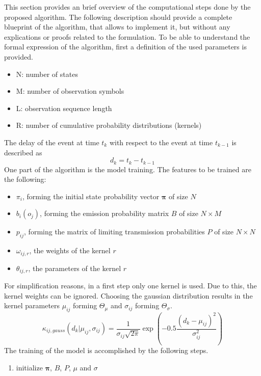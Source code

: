 \documentclass[12pt]{article} %
\begin{document}
This section provides an brief overview of the computational steps done by the
proposed algorithm. The following description should provide a complete
blueprint of the algorithm, that allows to implement it, but without any
explications or proofs related to the formulation. To be able to understand the
formal expression of the algorithm, first a definition of the used parameters
is provided.
\begin{itemize}
    \item N: number of states
    \item M: number of observation symbols
    \item L: observation sequence length
    \item R: number of cumulative probability distributions (kernels)
\end{itemize}
The delay of the event at time $ t_k $ with respect to the event at time
$ t_{k-1} $ is described as
\begin{equation}
    d_k = t_k-t_{k-1}
\end{equation}
One part of the algorithm is the model training. The features to be trained are
the following:
\begin{itemize}
    \item $ \pi_i $, forming the initial state probability vector
        $ \boldsymbol{\pi} $ of size $ N $
    \item $ b_i(o_j) $, forming the emission probability matrix $ B $ of size
        $ N \times M $
    \item $ p_{ij} $, forming the matrix of limiting transmission probabilities
        $ P $ of size $ N \times N $
    \item $ \omega_{ij, r} $, the weights of the kernel $ r $
    \item $ \theta_{ij, r} $, the parameters of the kernel $ r $
\end{itemize}
For simplification reasons, in a first step only one kernel is used. Due to 
this, the kernel weights can be ignored. Choosing the gaussian distribution
results in the kernel parameters $ \mu_{ij} $ forming $ \Theta_{\mu} $ and
$ \sigma_{ij} $ forming $ \Theta_\sigma $.
\begin{equation}
    \kappa_{ij, gauss}(d_k | \mu_{ij}, \sigma_{ij}) = 
        \frac{1}{\sigma_{ij} \sqrt{2 \pi}}
        \exp(-0.5 \frac{(d_k - \mu_{ij})^2}{\sigma_{ij}^2})
\end{equation}
The training of the model is accomplished by the following steps.
\begin{enumerate}
    \item initialize $ \boldsymbol{\pi} $, $ B $, $ P $, $ \mu $ and $ \sigma $
\end{enumerate}
\end{document}
